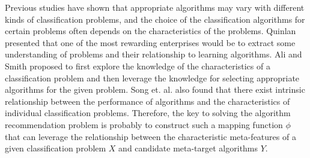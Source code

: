\documentclass[prodmode,acmtkdd]{acmsmall}
\begin{document}
Previous studies have shown that appropriate algorithms may vary with different kinds of classification problems,
and the choice of the classification algorithms for certain problems often depends on the characteristics of the problems.
Quinlan \cite{quinlan1994comparing} presented that one of the most rewarding enterprises would be
to extract some understanding of problems and their relationship to learning algorithms.
Ali and Smith \cite{ali2006learning} proposed to first explore the knowledge of the characteristics of a classification problem and then leverage the knowledge for selecting appropriate algorithms for the given problem.
Song et. al. \cite{song2012automatic} also found that there exist intrinsic relationship between the performance of algorithms
and the characteristics of individual classification problems.
Therefore,
the key to solving the algorithm recommendation problem is probably to construct such a mapping function $\phi$ that can leverage the relationship between the characteristic meta-features of a given classification problem $X$ and candidate meta-target algorithms $Y$.





\end{document}
